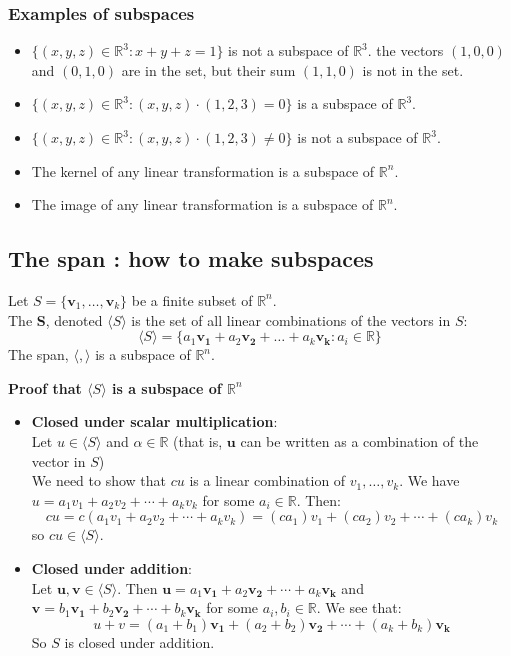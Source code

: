 \documentclass[a4paper, 9pt]{extarticle}
\begin{document}
\subsubsection*{Examples of subspaces}
\begin{itemize}
  \item $\{(x,y,z) \in \mathbb{R}^3 : x + y + z = 1\}$ is not a subspace of $\mathbb{R}^3$. the vectors $(1,0,0)$ and $(0,1,0)$ are in the set, but their sum $(1,1,0)$ is not in the set.
  \item $\{(x,y,z) \in \mathbb{R}^3 : (x,y,z) \cdot (1,2,3) = 0\}$ is a subspace of $\mathbb{R}^3$.
  \item $\{(x,y,z) \in \mathbb{R}^3 : (x,y,z) \cdot (1,2,3) \neq 0\}$ is not a subspace of $\mathbb{R}^3$.
  \item The kernel of any linear transformation is a subspace of $\mathbb{R}^n$.
  \item The image of any linear transformation is a subspace of $\mathbb{R}^n$.
\end{itemize}
\subsection{The span : how to make subspaces}
\begin{definitionbox}{}{}
  Let $S = \{ \mathbf{v}_1, \dots, \mathbf{v}_k \}$ be a finite subset of $\mathbb{R}^n$. \\
  The \textbf{S}, denoted $\langle S \rangle$ is the set of all linear combinations of the vectors in $S$:
  $$\langle S \rangle = \{a_1 \mathbf{v_1} + a_2 \mathbf{v_2} + \ldots + a_k \mathbf{v_k} : a_i \in \mathbb{R}\}$$
  The span, $\langle , \rangle$ is a subspace of $\mathbb{R}^n$.
\end{definitionbox}
\noindent \textbf{Proof that $\langle S \rangle$ is a subspace of $\mathbb{R}^n$}
\begin{itemize}
  \item \textbf{Closed under scalar multiplication}: \\
        Let $u \in \langle S \rangle$ and $\alpha \in \mathbb{R}$ (that is, $\mathbf{u}$ can be written as a combination of the vector in $S$) \\
        We need to show that $cu$ is a linear combination of $v_1, \dots, v_k$. We have $u = a_1v_1 + a_2v_2 + \cdots + a_kv_k$ for some $a_i \in \mathbb{R}$. Then:
        $$cu = c(a_1v_1 + a_2v_2 + \cdots + a_kv_k) = (ca_1)v_1 + (ca_2)v_2 + \cdots + (ca_k)v_k$$
        so $cu \in \langle S \rangle$.
  \item  \textbf{Closed under addition}: \\
        Let $\mathbf{u}, \mathbf{v} \in \langle S \rangle$. Then $\mathbf{u} = a_1\mathbf{v_1} + a_2\mathbf{v_2} + \cdots + a_k\mathbf{v_k}$ and $\mathbf{v} = b_1\mathbf{v_1} + b_2\mathbf{v_2} + \cdots + b_k\mathbf{v_k}$ for some $a_i, b_i \in \mathbb{R}$. We see that:
        $$u + v = (a_1 + b_1)\mathbf{v_1} + (a_2 + b_2)\mathbf{v_2} + \cdots + (a_k + b_k)\mathbf{v_k}$$
        So $S$ is closed under addition.

\end{itemize}
\end{document}

